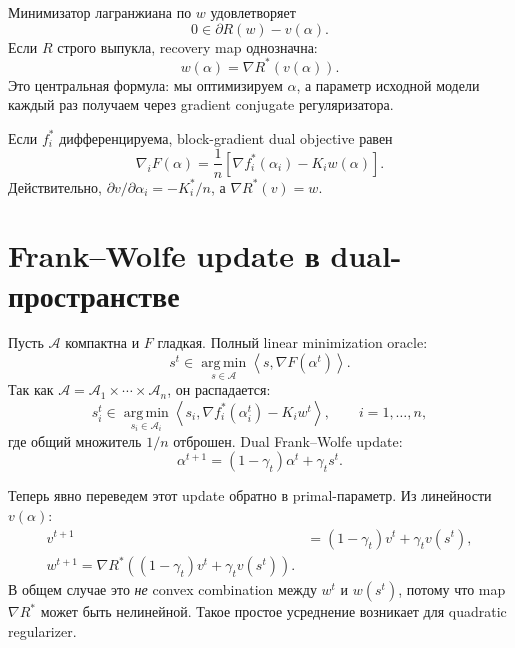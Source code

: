 \documentclass[11pt,a4paper]{article}
\newcommand{\A}{\mathcal{A}}
\newcommand{\ip}[2]{\left\langle #1,#2\right\rangle}
\newcommand{\argmin}{\operatorname*{arg\,min}}
\begin{document}
Минимизатор лагранжиана по \(w\) удовлетворяет
\[
  0\in\partial R(w)-v(\alpha).
\]
Если \(R\) строго выпукла, recovery map однозначна:
\begin{equation}
  \label{eq:recovery}
  \boxed{w(\alpha)=\nabla R^*(v(\alpha)).}
\end{equation}
Это центральная формула: мы оптимизируем \(\alpha\), а параметр исходной модели каждый раз получаем через gradient conjugate регуляризатора.

Если \(f_i^*\) дифференцируема, block-gradient dual objective равен
\begin{equation}
  \label{eq:dual-gradient}
  \boxed{
  \nabla_iF(\alpha)
  =\frac1n\left[
  \nabla f_i^*(\alpha_i)-K_iw(\alpha)
  \right].}
\end{equation}
Действительно, \(\partial v/\partial\alpha_i=-K_i^*/n\), а \(\nabla R^*(v)=w\).

\section{Frank--Wolfe update в dual-пространстве}

Пусть \(\A\) компактна и \(F\) гладкая. Полный linear minimization oracle:
\begin{equation}
  \label{eq:lmo-general}
  \boxed{
  s^t\in\argmin_{s\in\A}
  \ip{s}{\nabla F(\alpha^t)}.}
\end{equation}
Так как \(\A=\A_1\times\cdots\times\A_n\), он распадается:
\begin{equation}
  \label{eq:lmo-blocks}
  s_i^t\in\argmin_{s_i\in\A_i}
  \ip{s_i}{\nabla f_i^*(\alpha_i^t)-K_iw^t},
  \qquad i=1,\ldots,n,
\end{equation}
где общий множитель \(1/n\) отброшен. Dual Frank--Wolfe update:
\begin{equation}
  \label{eq:alpha-update}
  \boxed{
  \alpha^{t+1}=(1-\gamma_t)\alpha^t+\gamma_ts^t.}
\end{equation}

Теперь явно переведем этот update обратно в primal-параметр. Из линейности \(v(\alpha)\):
\begin{align}
  v^{t+1}
  &=(1-\gamma_t)v^t+\gamma_tv(s^t),
  \label{eq:v-update}\\
  \boxed{
  w^{t+1}
  =\nabla R^*\!\left((1-\gamma_t)v^t+\gamma_tv(s^t)\right).}
  \label{eq:w-general-update}
\end{align}
В общем случае это \emph{не} convex combination между \(w^t\) и \(w(s^t)\), потому что map \(\nabla R^*\) может быть нелинейной. Такое простое усреднение возникает для quadratic regularizer.
\end{document}
